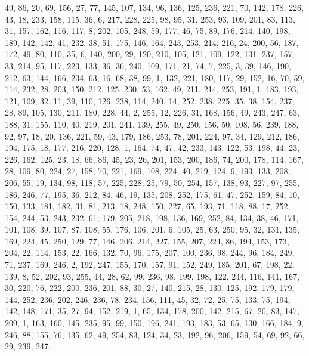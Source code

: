 \begin{DoxyCode}
       49, 86, 20, 69, 156, 27, 77, 145, 107, 134, 96, 136, 125, 236, 221, 70, 142, 178, 226, 43, 18, 233, 158,
       115, 36, 6, 217, 228, 225, 98, 95, 31, 253, 93, 109, 201, 83, 113, 31, 157, 162, 116, 117, 8, 202, 105, 248,
       59, 177, 46, 75, 89, 176, 214, 140, 198, 189, 142, 142, 41, 232, 38, 51, 175, 146, 164, 243, 253, 214, 216,
       24, 200, 56, 187, 172, 49, 80, 110, 35, 6, 140, 200, 29, 120, 210, 105, 121, 109, 122, 131, 237, 157, 33,
       214, 95, 117, 223, 133, 36, 36, 240, 109, 171, 21, 74, 7, 225, 3, 39, 146, 190, 212, 63, 144, 166, 234, 63, 16,
       68, 38, 99, 1, 132, 221, 180, 117, 29, 152, 16, 70, 59, 114, 232, 28, 203, 150, 212, 125, 230, 53, 162, 49,
       211, 214, 253, 191, 1, 183, 193, 121, 109, 32, 11, 39, 110, 126, 238, 114, 240, 14, 252, 238, 225, 35, 38,
       154, 237, 28, 89, 105, 130, 211, 180, 228, 44, 2, 255, 12, 226, 31, 168, 156, 49, 243, 247, 63, 188, 31,
       155, 110, 40, 219, 201, 241, 139, 255, 49, 250, 156, 50, 108, 56, 239, 188, 92, 97, 18, 20, 136, 221, 59, 43,
       179, 186, 253, 78, 201, 224, 97, 34, 129, 212, 186, 194, 175, 18, 177, 216, 220, 128, 1, 164, 74, 47, 42,
       233, 143, 122, 53, 198, 44, 23, 226, 162, 125, 23, 18, 66, 86, 45, 23, 26, 201, 153, 200, 186, 74, 200, 178,
       114, 167, 28, 109, 80, 224, 27, 158, 70, 221, 169, 108, 224, 40, 219, 124, 9, 193, 133, 208, 206, 55, 19, 134,
       98, 118, 57, 225, 228, 25, 79, 50, 254, 157, 138, 93, 227, 97, 255, 186, 246, 77, 195, 36, 212, 84, 46, 19,
       135, 208, 252, 175, 61, 47, 252, 159, 84, 10, 150, 133, 181, 182, 31, 81, 213, 18, 248, 150, 227, 65, 193,
       71, 118, 88, 17, 252, 154, 244, 53, 243, 232, 61, 179, 205, 218, 198, 136, 169, 252, 84, 134, 38, 46, 171,
       101, 108, 39, 107, 87, 108, 55, 176, 106, 201, 6, 105, 25, 63, 250, 95, 32, 131, 135, 169, 224, 45, 250, 129,
       77, 146, 206, 214, 227, 155, 207, 224, 86, 194, 153, 173, 204, 22, 114, 153, 22, 166, 132, 70, 96, 175,
       207, 100, 236, 98, 244, 96, 184, 249, 71, 237, 169, 246, 2, 192, 247, 155, 170, 157, 91, 152, 249, 185, 201,
       67, 198, 22, 139, 8, 52, 202, 93, 255, 44, 28, 62, 99, 236, 98, 199, 198, 122, 244, 116, 141, 167, 30, 220,
       76, 222, 200, 236, 201, 88, 30, 27, 140, 215, 28, 130, 125, 192, 179, 179, 144, 252, 236, 202, 246, 236, 78,
       234, 156, 111, 45, 32, 72, 25, 75, 133, 75, 194, 142, 148, 171, 35, 27, 94, 152, 219, 1, 65, 134, 178, 200,
       142, 215, 67, 20, 83, 147, 209, 1, 163, 160, 145, 235, 95, 99, 150, 196, 241, 193, 183, 53, 65, 130, 166,
       184, 9, 246, 88, 155, 76, 135, 62, 49, 254, 83, 124, 34, 23, 192, 96, 206, 159, 54, 69, 92, 66, 29, 239, 247,

\end{DoxyCode}
